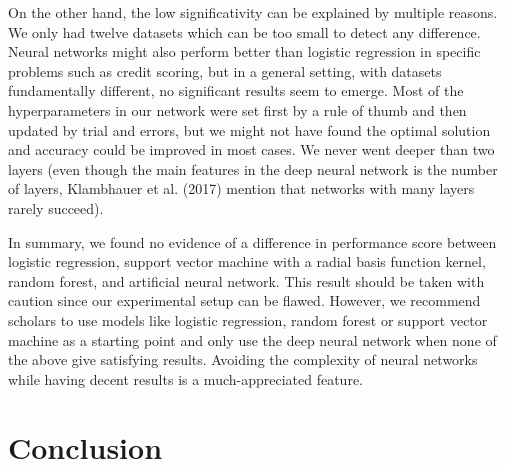 \documentclass[a4paper,12pt]{article}
\numberwithin{equation}{section}
\begin{document}
On the other hand, the low significativity can be explained by multiple reasons. We only had twelve datasets which can be too small to detect any difference. Neural networks might also perform better than logistic regression in specific problems such as credit scoring, but in a general setting, with datasets fundamentally different, no significant results seem to emerge. Most of the hyperparameters in our network were set first by a rule of thumb and then updated by trial and errors, but we might not have found the optimal solution and accuracy could be improved in most cases. We never went deeper than two layers (even though the main features in the deep neural network is the number of layers, Klambhauer et al. (2017) mention that networks with many layers rarely succeed).

In summary, we found no evidence of a difference in performance score between logistic regression, support vector machine with a radial basis function kernel, random forest, and artificial neural network. This result should be taken with caution since our experimental setup can be flawed. However, we recommend scholars to use models like logistic regression, random forest or support vector machine as a starting point and only use the deep neural network when none of the above give satisfying results. Avoiding the complexity of neural networks while having decent results is a much-appreciated feature.   



\newpage
\section{Conclusion}
\end{document}
